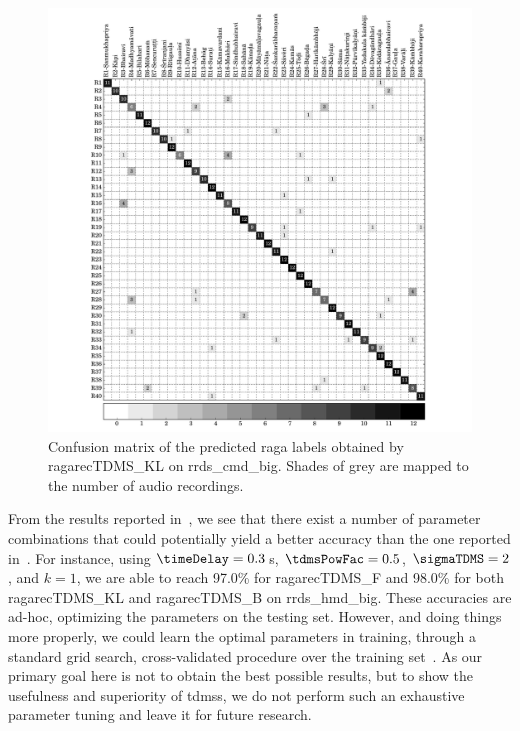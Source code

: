 \begin{figure}[h]
	\begin{center}
		\includegraphics[width=\figSizeNinety]{ch07_ragaRecognition/figures/CM_tdms_cmd_var1.pdf}
	\end{center}
	\caption{Confusion matrix of the predicted \gls{raga} labels obtained by \acrshort{ragarecTDMS_KL} on \acrshort{rrds_cmd_big}. Shades of grey are mapped to the number of audio recordings.} 
	\label{confusion_mtx_carnatic_tdms}
\end{figure}

From the results reported in~, we see that there exist a number of parameter combinations that could potentially yield a better accuracy than the one reported in~. For instance, using  $\timeDelay=0.3$\,s, $\tdmsPowFac=0.5$, $\sigmaTDMS=2$, and $k=1$, we are able to reach 97.0\% for \acrshort{ragarecTDMS_F} and 98.0\% for both \acrshort{ragarecTDMS_KL} and \acrshort{ragarecTDMS_B} on \acrshort{rrds_hmd_big}. These accuracies are ad-hoc, optimizing the parameters on the testing set. However, and doing things more properly, we could learn the optimal parameters in training, through a standard grid search, cross-validated procedure over the training set~\cite{Mitchell97BOOK}. As our primary goal here is not to obtain the best possible results, but to show the usefulness and superiority of \glspl{tdms}, we do not perform such an exhaustive parameter tuning and leave it for future research.

